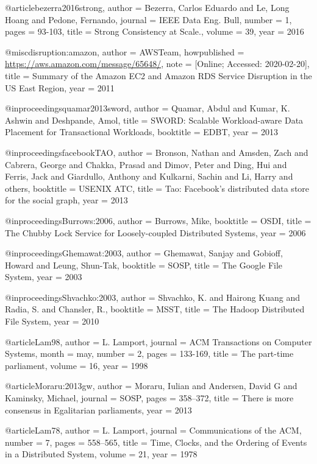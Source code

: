 @article{bezerra2016strong,
  author  = {Bezerra, Carlos Eduardo and Le, Long Hoang and Pedone, Fernando},
  journal = {IEEE Data Eng. Bull},
  number  = {1},
  pages   = {93-103},
  title   = {Strong Consistency at Scale.},
  volume  = {39},
  year    = {2016}
}

@misc{disruption:amazon,
  author       = {AWS{}Team},
  howpublished = {\url{https://aws.amazon.com/message/65648/}},
  note         = {[Online; Accessed: 2020-02-20]},
  title        = {Summary of the Amazon EC2 and Amazon RDS Service Disruption in the US East Region},
  year         = {2011}
}

@inproceedings{quamar2013sword,
  author    = {Quamar, Abdul and Kumar, K. Ashwin and Deshpande, Amol},
  title     = {SWORD: Scalable Workload-aware Data Placement for Transactional Workloads},
  booktitle = {EDBT},
  year      = {2013}
}

@inproceedings{facebookTAO,
  author    = {Bronson, Nathan and Amsden, Zach and Cabrera, George and Chakka, Prasad and Dimov, Peter and Ding, Hui and Ferris, Jack and Giardullo, Anthony and Kulkarni, Sachin and Li, Harry and others},
  booktitle = {USENIX ATC},
  title     = {Tao: Facebook's distributed data store for the social graph},
  year      = {2013}
}

@inproceedings{Burrows:2006,
  author    = {Burrows, Mike},
  booktitle = {OSDI},
  title     = {The Chubby Lock Service for Loosely-coupled Distributed Systems},
  year      = {2006}
}

@inproceedings{Ghemawat:2003,
  author    = {Ghemawat, Sanjay and Gobioff, Howard and Leung, Shun-Tak},
  booktitle = {SOSP},
  title     = {The Google File System},
  year      = {2003}
}

@inproceedings{Shvachko:2003,
  author    = {Shvachko, K. and Hairong Kuang and Radia, S. and Chansler, R.},
  booktitle = {MSST},
  title     = {The Hadoop Distributed File System},
  year      = {2010}
}

@article{Lam98,
  author  = {L. Lamport},
  journal = {ACM Transactions on Computer Systems},
  month   = may,
  number  = 2,
  pages   = {133-169},
  title   = {The part-time parliament},
  volume  = {16},
  year    = 1998
}

@article{Moraru:2013gw,
  author  = {Moraru, Iulian and Andersen, David G and Kaminsky, Michael},
  journal = {SOSP},
  pages   = {358--372},
  title   = {{There is more consensus in Egalitarian parliaments}},
  year    = {2013}
}


@article{Lam78,
  author  = {L. Lamport},
  journal = {Communications of the ACM},
  number  = {7},
  pages   = {558--565},
  title   = {Time, Clocks, and the Ordering of Events in a Distributed System},
  volume  = {21},
  year    = {1978}
}


